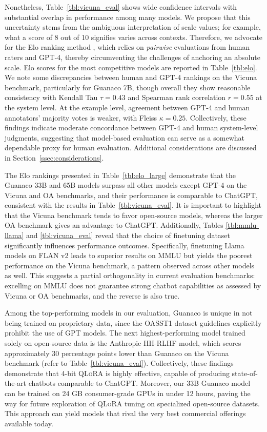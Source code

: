 Nonetheless, Table~\ref{tbl:vicuna_eval} shows wide confidence intervals with substantial overlap in performance among many models. We propose that this uncertainty stems from the ambiguous interpretation of scale values; for example, what a score of 8 out of 10 signifies varies across contexts. Therefore, we advocate for the Elo ranking method \citep{elo1967proposed}, which relies on \textit{pairwise} evaluations from human raters and GPT-4, thereby circumventing the challenges of anchoring an absolute scale. Elo scores for the most competitive models are reported in Table~\ref{tbl:elo}. We note some discrepancies between human and GPT-4 rankings on the Vicuna benchmark, particularly for Guanaco 7B, though overall they show reasonable consistency with Kendall Tau $\tau=0.43$ and Spearman rank correlation $r=0.55$ at the system level. At the example level, agreement between GPT-4 and human annotators' majority votes is weaker, with Fleiss $\kappa=0.25$. Collectively, these findings indicate moderate concordance between GPT-4 and human system-level judgments, suggesting that model-based evaluation can serve as a somewhat dependable proxy for human evaluation. Additional considerations are discussed in Section~\ref{ssec:considerations}.

The Elo rankings presented in Table~\ref{tbl:elo_large} demonstrate that the {Guanaco} 33B and 65B models surpass all other models except GPT-4 on the Vicuna and OA benchmarks, and their performance is comparable to ChatGPT, consistent with the results in Table~\ref{tbl:vicuna_eval}. It is important to highlight that the Vicuna benchmark tends to favor open-source models, whereas the larger OA benchmark gives an advantage to ChatGPT. Additionally, Tables \ref{tbl:mmlu-llama} and \ref{tbl:vicuna_eval} reveal that the choice of finetuning dataset significantly influences performance outcomes. Specifically, finetuning Llama models on FLAN v2 leads to superior results on MMLU but yields the poorest performance on the Vicuna benchmark, a pattern observed across other models as well. This suggests a partial orthogonality in current evaluation benchmarks: excelling on MMLU does not guarantee strong chatbot capabilities as assessed by Vicuna or OA benchmarks, and the reverse is also true.

Among the top-performing models in our evaluation, {Guanaco} is unique in not being trained on proprietary data, since the OASST1 dataset guidelines explicitly prohibit the use of GPT models. The next highest-performing model trained solely on open-source data is the Anthropic HH-RLHF model, which scores approximately 30 percentage points lower than {Guanaco} on the Vicuna benchmark (refer to Table~\ref{tbl:vicuna_eval}). Collectively, these findings demonstrate that 4-bit \textsc{QLoRA} is highly effective, capable of producing state-of-the-art chatbots comparable to ChatGPT. Moreover, our 33B {Guanaco} model can be trained on 24 GB consumer-grade GPUs in under 12 hours, paving the way for future exploration of \textsc{QLoRA} tuning on specialized open-source datasets. This approach can yield models that rival the very best commercial offerings available today.

